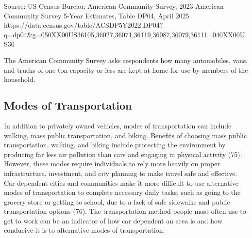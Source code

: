 \documentclass[
  english,
  letterpaper,
]{report}
\begin{document}
\begin{tcolorbox}[enhanced jigsaw, breakable, leftrule=.75mm, title=\textcolor{quarto-callout-note-color}{\faInfo}\hspace{0.5em}{Source}, bottomrule=.15mm, opacityback=0, left=2mm, colback=white, bottomtitle=1mm, coltitle=black, colbacktitle=quarto-callout-note-color!10!white, colframe=quarto-callout-note-color-frame, opacitybacktitle=0.6, toptitle=1mm, titlerule=0mm, arc=.35mm, rightrule=.15mm, toprule=.15mm]

Source: US Census Bureau; American Community Survey, 2023 American
Community Survey 5-Year Estimates, Table DP04, April 2025
https://data.census.gov/table/ACSDP5Y2022.DP04?q=dp04\&g=050XX00US36105,36027,36071,36119,36087,36079,36111\_040XX00US36

\end{tcolorbox}

\begin{tcolorbox}[enhanced jigsaw, breakable, leftrule=.75mm, title=\textcolor{quarto-callout-note-color}{\faInfo}\hspace{0.5em}{Note}, bottomrule=.15mm, opacityback=0, left=2mm, colback=white, bottomtitle=1mm, coltitle=black, colbacktitle=quarto-callout-note-color!10!white, colframe=quarto-callout-note-color-frame, opacitybacktitle=0.6, toptitle=1mm, titlerule=0mm, arc=.35mm, rightrule=.15mm, toprule=.15mm]

The American Community Survey asks respondents how many automobiles,
vans, and trucks of one-ton capacity or less are kept at home for use by
members of the household.

\end{tcolorbox}

\subsection{Modes of Transportation}\label{modes-of-transportation}

In addition to privately owned vehicles, modes of transportation can
include walking, mass public transportation, and biking. Benefits of
choosing mass public transportation, walking, and biking include
protecting the environment by producing far less air pollution than cars
and engaging in physical activity (75). However, these modes require
individuals to rely more heavily on proper infrastructure, investment,
and city planning to make travel safe and effective. Car-dependent
cities and communities make it more difficult to use alternative modes
of transportation to complete necessary daily tasks, such as going to
the grocery store or getting to school, due to a lack of safe sidewalks
and public transportation options (76). The transportation method people
most often use to get to work can be an indicator of how car dependent
an area is and how conducive it is to alternative modes of
transportation.
\end{document}
